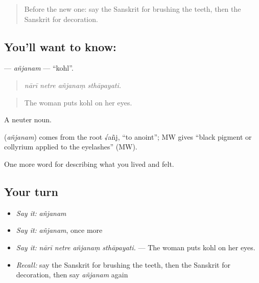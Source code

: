 \label{lesson:SA-C487-anjanam}



\begin{quote}
Before the new one: say the Sanskrit for brushing the teeth, then the Sanskrit for decoration.
\end{quote}

\subsection*{You'll want to know: }
\textbf{} — \emph{añjanam} — \textquotedblleft{}kohl\textquotedblright{}.

\begin{quote}
   
\end{quote}

\begin{quote}
\emph{nārī netre añjanaṃ sthāpayati.}
\end{quote}

\begin{quote}
The woman puts kohl on her eyes.
\end{quote}

A neuter noun.

\begin{cousinweb}
\textbf{} (\emph{añjanam}) comes from the root √añj, \textquotedblleft{}to anoint\textquotedblright{}; MW gives \textquotedblleft{}black pigment or collyrium applied to the eyelashes\textquotedblright{} (MW).
\end{cousinweb}

\begin{grammarlens}[title={What you've built}]
One more word for describing what you lived and felt.
\end{grammarlens}

\subsection*{Your turn}
\begin{itemize}
\raggedright
  \item \emph{Say it:} \emph{añjanam}
  \item \emph{Say it:} \emph{añjanam}, once more
  \item \emph{Say it:} \emph{nārī netre añjanaṃ sthāpayati.} — The woman puts kohl on her eyes.
  \item \emph{Recall:} say the Sanskrit for brushing the teeth, then the Sanskrit for decoration, then say \emph{añjanam} again
\end{itemize}


